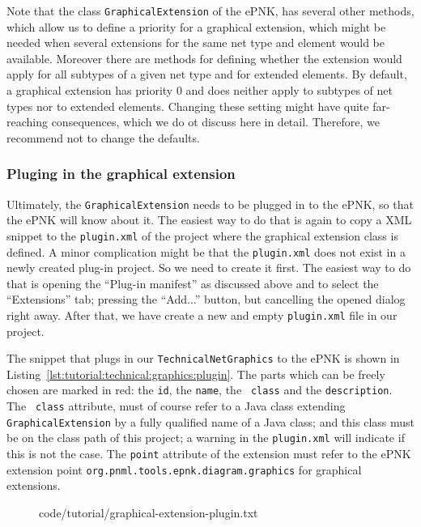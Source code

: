 Note that the class {\tt GraphicalExtension} of the ePNK, has several other
methods, which allow us to define a priority for a graphical extension, which
might be needed when several extensions for the same net type and element would be
available. Moreover there are methods for defining whether the extension would
apply for all subtypes of a given net type and for extended elements. By
default, a graphical extension has priority $0$ and does neither apply to
subtypes of net types nor to extended elements. Changing these setting might
have quite far-reaching consequences, which we do ot discuss here in detail.
Therefore, we recommend not to change the defaults.

\subsubsection{Pluging in the graphical extension}
\label{subsubsec:tutorial:technical:graphics:plugin}

Ultimately, the {\tt GraphicalExtension} needs to be plugged in to the ePNK,
so that the ePNK will know about it. The easiest way to do that is
again to copy a XML snippet to the {\tt plugin.xml} of the project where the
graphical extension class is defined. A minor complication might be that
the {\tt plugin.xml} does not exist in a newly created plug-in project. So
we need to create it first. The easiest way to do that is opening the ``Plug-in
manifest'' as discussed above and to select the ``Extensions'' tab; 
pressing the ``Add...'' button, but cancelling the opened dialog right away.
After that, we have create a new and empty {\tt plugin.xml} file in our project.

The snippet that plugs in our {\tt TechnicalNetGraphics} to the ePNK is shown
in Listing~\ref{lst:tutorial:technical:graphics:plugin}. The parts which can
be freely chosen are marked in red: the {\tt id}, the {\tt name}, the {\tt
class} and the {\tt description}. The {\tt
class} attribute, must of course refer to a Java class extending {\tt
GraphicalExtension} by a fully qualified name of a Java class; and this class
must be on the class path of this project; a warning in the {\tt plugin.xml}
will indicate if this is not the case. The {\tt point} attribute of the
extension must refer to the ePNK extension
point {\tt org.pnml.tools.epnk.diagram.graphics} for graphical extensions.

\begin{figure}[htbp!]
%
  {code/tutorial/graphical-extension-plugin.txt}
\end{figure}


